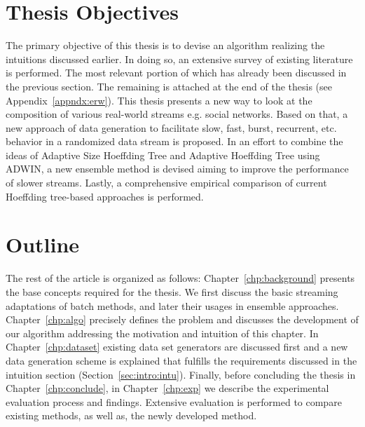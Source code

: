 

\section{Thesis Objectives}
The primary objective of this thesis is to devise an algorithm realizing the intuitions discussed earlier. In doing so, an extensive survey of existing literature is performed. The most relevant portion of which has already been discussed in the previous section. The remaining is attached at the end of the thesis (see Appendix~\ref{appndx:erw}). This thesis presents a new way to look at the composition of various real-world streams e.g. social networks. Based on that, a new approach of data generation to facilitate slow, fast, burst, recurrent, etc. behavior in a randomized data stream is proposed. In an effort to combine the ideas of Adaptive Size Hoeffding Tree and Adaptive Hoeffding Tree using ADWIN, a new ensemble method is devised aiming to improve the performance of slower streams. Lastly, a comprehensive empirical comparison of current Hoeffding tree-based approaches is performed.


\section{Outline}
The rest of the article is organized as follows: Chapter~\ref{chp:background} presents the base concepts required for the thesis. We first discuss the basic streaming adaptations of batch methods, and later their usages in ensemble approaches. Chapter~\ref{chp:algo} precisely defines the problem and discusses the development of our algorithm addressing the motivation and intuition of this chapter. In Chapter~\ref{chp:dataset} existing data set generators are discussed first and a new data generation scheme is explained that fulfills the requirements discussed in the intuition section (Section~\ref{sec:intro:intu}). Finally, before concluding the thesis in Chapter~\ref{chp:conclude}, in Chapter~\ref{chp:exp} we describe the experimental evaluation process and findings. Extensive evaluation is performed to compare existing methods, as well as, the newly developed method. 
